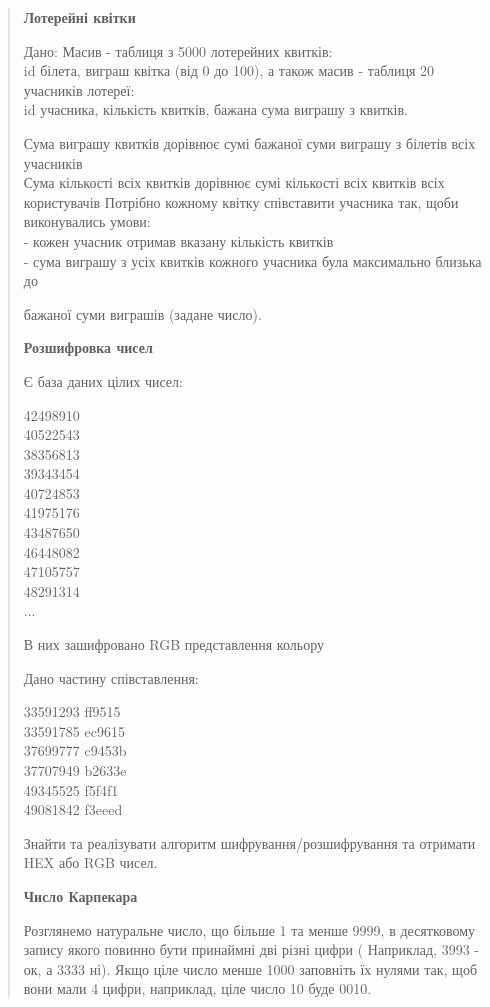 \documentclass[]{article}
\begin{document}
\begin{quote}
\textbf{Лотерейні квітки}

Дано: Масив - таблиця з 5000 лотерейних квитків:\\
id білета, виграш квітка (від 0 до 100), а також масив - таблиця 20
учасників лотереї:\\
id учасника, кількість квитків, бажана сума виграшу з квитків.

Сума виграшу квитків дорівнює сумі бажаної суми виграшу з білетів всіх
учасників\\
Сума кількості всіх квитків дорівнює сумі кількості всіх квитків всіх
користувачів Потрібно кожному квітку співставити учасника так, щоби
виконувались умови:\\
- кожен учасник отримав вказану кількість квитків\\
- сума виграшу з усіх квитків кожного учасника була максимально близька
до

бажаної суми виграшів (задане число).

\textbf{Розшифровка чисел}

Є база даних цілих чисел:

42498910\\
40522543\\
38356813\\
39343454\\
40724853\\
41975176\\
43487650\\
46448082\\
47105757\\
48291314\\
...

В них зашифровано RGB представлення кольору

Дано частину співставлення:

33591293 ff9515\\
33591785 ec9615\\
37699777 c9453b\\
37707949 b2633e\\
49345525 f5f4f1\\
49081842 f3eeed

Знайти та реалізувати алгоритм шифрування/розшифрування та отримати HEX
або RGB чисел.

\textbf{Число Карпекара}

Розглянемо натуральне число, що більше 1 та менше 9999, в десятковому
запису якого повинно бути принаймні дві різні цифри ( Наприклад, 3993 -
ок, а 3333 ні). Якщо ціле число менше 1000 заповніть їх нулями так, щоб
вони мали 4 цифри, наприклад, ціле число 10 буде 0010.


\end{quote}
\end{document}
